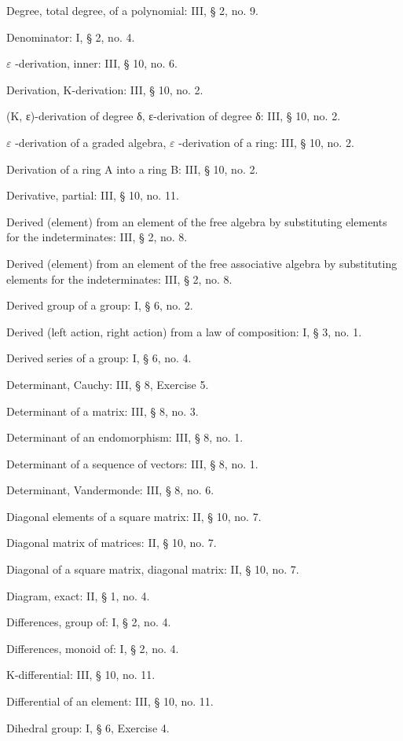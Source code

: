 Degree, total degree, of a polynomial: III, § 2, no. 9.

Denominator: I, § 2, no. 4.

\(\varepsilon\) -derivation, inner: III, § 10, no. 6.

Derivation, K-derivation: III, § 10, no. 2.

(K, ε)-derivation of degree δ, ε-derivation of degree δ: III, § 10, no. 2.

\(\varepsilon\) -derivation of a graded algebra, \(\varepsilon\) -derivation of a ring: III, § 10, no. 2.

Derivation of a ring A into a ring B: III, § 10, no. 2.

Derivative, partial: III, § 10, no. 11.

Derived (element) from an element of the free algebra by substituting elements for the indeterminates: III, § 2, no. 8.

Derived (element) from an element of the free associative algebra by substituting elements for the indeterminates: III, § 2, no. 8.

Derived group of a group: I, § 6, no. 2.

Derived (left action, right action) from a law of composition: I, § 3, no. 1.

Derived series of a group: I, § 6, no. 4.

Determinant, Cauchy: III, § 8, Exercise 5.

Determinant of a matrix: III, § 8, no. 3.

Determinant of an endomorphism: III, § 8, no. 1.

Determinant of a sequence of vectors: III, § 8, no. 1.

Determinant, Vandermonde: III, § 8, no. 6.

Diagonal elements of a square matrix: II, § 10, no. 7.

Diagonal matrix of matrices: II, § 10, no. 7.

Diagonal of a square matrix, diagonal matrix: II, § 10, no. 7.

Diagram, exact: II, § 1, no. 4.

Differences, group of: I, § 2, no. 4.

Differences, monoid of: I, § 2, no. 4.

K-differential: III, § 10, no. 11.

Differential of an element: III, § 10, no. 11.

Dihedral group: I, § 6, Exercise 4.

